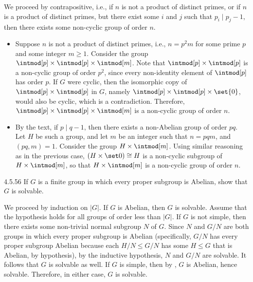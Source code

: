 \begin{sol}
	We proceed by contrapositive, i.e., if $n$ is not a product of distinct primes, or if $n$ is a product of distinct primes, but there exist some $i$ and $j$ such that $p_i \mid p_j - 1$, then there exists some non-cyclic group of order $n$.
	\begin{itemize}
		\item Suppose $n$ is not a product of distinct primes, i.e., $n = p^2m$ for some prime $p$ and some integer $m \geq 1$.
	Consider the group $\intmod[p] \times \intmod[p] \times \intmod[m]$.
	Note that $\intmod[p] \times \intmod[p]$ is a non-cyclic group of order $p^2$, since every non-identity element of $\intmod[p]$ has order $p$.
	If $G$ were cyclic, then the isomorphic copy of $\intmod[p] \times \intmod[p]$ in $G$, namely $\intmod[p] \times \intmod[p] \times \set{0}$, would also be cyclic, which is a contradiction.
	Therefore, $\intmod[p] \times \intmod[p] \times \intmod[m]$ is a non-cyclic group of order $n$.
		\item By the text, if $p \mid q - 1$, then there exists a non-Abelian group of order $pq$.
	Let $H$ be such a group, and let $m$ be an integer such that $n = pqm$, and $(pq, m) = 1$.
	Consider the group $H \times \intmod[m]$.
	Using similar reasoning as in the previous case, $(H \times \set 0) \cong H$ is a non-cyclic subgroup of $H \times \intmod[m]$, so that $H \times \intmod[m]$ is a non-cyclic group of order $n$. \qedhere
	\end{itemize}
\end{sol}

\begin{exercise}{4.5.56}
	If $G$ is a finite group in which every proper subgroup is Abelian, show that $G$ is solvable.
\end{exercise}

\begin{sol}
	We proceed by induction on $|G|$.
	If $G$ is Abelian, then $G$ is solvable.
	Assume that the hypothesis holds for all groups of order less than $|G|$.
	If $G$ is not simple, then there exists some non-trivial normal subgroup $N$ of $G$.
	Since $N$ and $G/N$ are both groups in which every proper subgroup is Abelian (specifically, $G/N$ has every proper subgroup Abelian because each $H/N \leq G/N$ has some $H \leq G$ that is Abelian, by hypothesis), by the inductive hypothesis, $N$ and $G/N$ are solvable.
	It follows that $G$ is solvable as well.
	If $G$ is simple, then by , $G$ is Abelian, hence solvable.
	Therefore, in either case, $G$ is solvable.
\end{sol}